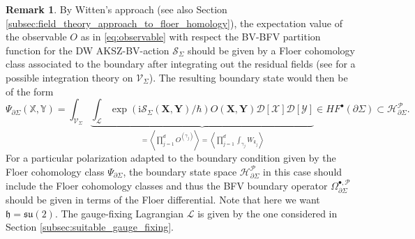 \documentclass[11pt,colorinlistoftodos]{amsart}
\numberwithin{equation}{subsection}
\theoremstyle{plain}
\theoremstyle{definition}
\newtheorem{rem}[thm]{Remark}
\theoremstyle{remark}
\newcommand{\de}{\partial}
\newcommand{\calH}{\mathcal{H}}
\newcommand{\calS}{\mathcal{S}}
\newcommand{\calL}{\mathcal{L}}
\newcommand{\calP}{\mathcal{P}}
\newcommand{\I}{\mathrm{i}}
\newcommand{\calV}{\mathcal{V}}
\begin{document}
\begin{rem}\label{rem:Floer_group_boundary_state}
By Witten's approach \cite{Witten1988} (see also Section \ref{subsec:field_theory_approach_to_floer_homology}), the expectation value of the observable $O$ as in \eqref{eq:observable} with respect the BV-BFV partition function for the DW AKSZ-BV-action $\calS_\Sigma$ should be given by a Floer cohomology class associated to the boundary after integrating out the residual fields (see \cite{CMR2} for a possible integration theory on $\calV_\Sigma$). The resulting boundary state would then be of the form
\[
\Psi_{\de\Sigma}(\mathds{X},\mathds{Y})=\int_{\calV_\Sigma}\underbrace{\int_{\calL}\exp(\I\calS_\Sigma(\mathbf{X},\mathbf{Y})/\hbar)O(\mathbf{X},\mathbf{Y})\mathscr{D}[\mathscr{X}]\mathscr{D}[\mathscr{Y}]}_{=\left\langle\prod_{j=1}^dO^{(\gamma_j)}\right\rangle=\left\langle \prod_{j=1}^d\int_{\gamma_j}W_{k_j}\right\rangle}\in HF^\bullet(\de\Sigma)\subset\calH^\calP_{\de\Sigma}.
\]
For a particular polarization adapted to the boundary condition given by the Floer cohomology class $\Psi_{\de\Sigma}$, the boundary state space $\calH^\calP_{\de\Sigma}$ in this case should include the Floer cohomology classes and thus the BFV boundary operator $\Omega^{\bullet,\calP}_{\de\Sigma}$ should be given in terms of the Floer differential. Note that here we want $\mathfrak{h}=\mathfrak{su}(2)$. The gauge-fixing Lagrangian $\calL$ is given by the one considered in Section \ref{subsec:suitable_gauge_fixing}.
\end{rem}
\end{document}
